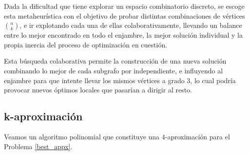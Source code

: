 \documentclass[10pt]{amsart}
\theoremstyle{definition}
\numberwithin{equation}{section}
\begin{document}
	Dada la dificultad que tiene explorar un espacio combinatorio discreto, se escoge esta 
	metaheurística con el objetivo de probar distintas combinaciones de vértices $\binom{n}{k}$, e ir
	explotando cada una de ellas colaborativamente, llevando un balance entre lo mejor encontrado 
	en todo el enjambre, la mejor solución individual y la propia inercia del proceso de optimización
	en cuestión.
	
	Esta búsqueda colaborativa permite la construcción de una nueva solución combinando lo mejor de 
	cada subgrafo por independiente, e influyendo al enjambre para que intente llevar los mismos 
	vértices a grado 3, lo cual podría provocar nuevos óptimos locales que pasarían a dirigir al resto.
	
	\subsection{k-aproximaci\'on}
	
	Veamos  un algoritmo polinomial que constituye una $4$-aproximaci\'on para el Problema \ref{best_appx}.
	
\end{document}
